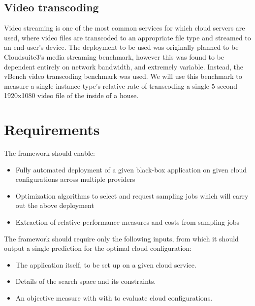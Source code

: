 \documentclass{report}
\begin{document}
\subsection{Video transcoding}
Video streaming is one of the most common services for which cloud servers are used, where video files are transcoded to an appropriate file type and streamed to an end-user's device\cite{JunXin2005a, Lottarini2018}.
The deployment to be used was originally planned to be Cloudsuite3's media streaming benchmark\cite{Palit2016}, however this was found to be dependent entirely on network bandwidth, and extremely variable. Instead, the vBench video transcoding benchmark was used\cite{Lottarini2018}. We will use this benchmark to measure a single instance type's relative rate of transcoding a single 5 second 1920x1080 video file of the inside of a house.
\section{Requirements}
The framework should enable:
\begin{itemize}
\singlespacing
\item Fully automated deployment of a given black-box application on given cloud configurations across multiple providers
\item Optimization algorithms to select and request sampling jobs which will carry out the above deployment
\item Extraction of relative performance measures and costs from sampling jobs
\end{itemize}
The framework should require only the following inputs, from which it should output a single prediction for the optimal cloud configuration:
\begin{itemize}
\item The application itself, to be set up on a given cloud service.
\item Details of the search space and its constraints.
\item An objective measure with with to evaluate cloud configurations.
\end{itemize}
\end{document}
